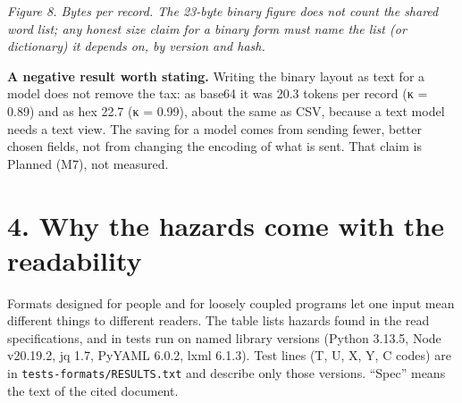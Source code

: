 \documentclass[10pt,letterpaper]{article}
\begin{document}
\emph{Figure 8. Bytes per record. The 23-byte binary figure does not
count the shared word list; any honest size claim for a binary form must
name the list (or dictionary) it depends on, by version and hash.}

\textbf{A negative result worth stating.} Writing the binary layout as
text for a model does not remove the tax: as base64 it was 20.3 tokens
per record (κ = 0.89) and as hex 22.7 (κ = 0.99), about the same as CSV,
because a text model needs a text view. The saving for a model comes
from sending fewer, better chosen fields, not from changing the encoding
of what is sent. That claim is Planned (M7), not measured.

\section{4. Why the hazards come with the
readability}\label{why-the-hazards-come-with-the-readability}

Formats designed for people and for loosely coupled programs let one
input mean different things to different readers. The table lists
hazards found in the read specifications, and in tests run on named
library versions (Python 3.13.5, Node v20.19.2, jq 1.7, PyYAML 6.0.2,
lxml 6.1.3). Test lines (T, U, X, Y, C codes) are in
\texttt{tests-\allowbreak{}formats/\allowbreak{}RESULTS.\allowbreak{}txt} and describe only those versions.
``Spec'' means the text of the cited document.
\end{document}
